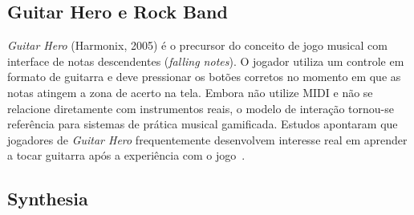 \documentclass[
  12pt,
  openright,
  twoside,
  a4paper,
  english,
  brazil
]{abntex2}
\begin{document}
\begin{table}[htbp]
  \centering
  \caption{Comparação entre trabalhos relacionados e o sistema proposto.}
  \label{tab:relacionados}
\end{table}

\subsection{Guitar Hero\textregistered{} e Rock Band\textregistered}

\textit{Guitar Hero\textregistered} (Harmonix, 2005) é o precursor do
conceito de jogo musical com interface de notas descendentes
(\textit{falling notes}). O jogador utiliza um controle em formato de
guitarra e deve pressionar os botões corretos no momento em que as notas
atingem a zona de acerto na tela. Embora não utilize MIDI e não se
relacione diretamente com instrumentos reais, o modelo de interação
tornou-se referência para sistemas de prática musical gamificada.
Estudos apontaram que jogadores de \textit{Guitar Hero} frequentemente
desenvolvem interesse real em aprender a tocar guitarra após a
experiência com o jogo~\cite{hjorth2009}.

\subsection{Synthesia}
\end{document}
